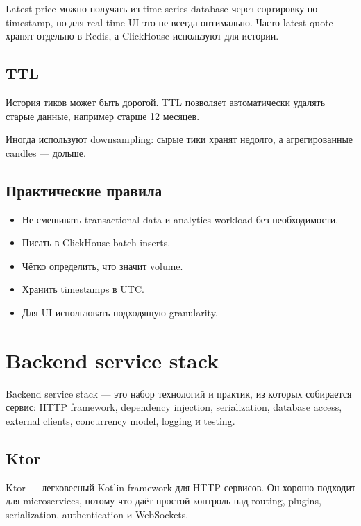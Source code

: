 \documentclass[12pt,a4paper]{article}
\begin{document}
Latest price можно получать из time-series database через сортировку по timestamp,
но для real-time UI это не всегда оптимально. Часто latest quote хранят отдельно
в Redis, а ClickHouse используют для истории.

\subsection{TTL}

История тиков может быть дорогой. TTL позволяет автоматически удалять старые
данные, например старше 12 месяцев.

Иногда используют downsampling: сырые тики хранят недолго, а агрегированные
candles --- дольше.

\subsection{Практические правила}

\begin{itemize}
    \item Не смешивать transactional data и analytics workload без необходимости.
    \item Писать в ClickHouse batch inserts.
    \item Чётко определить, что значит volume.
    \item Хранить timestamps в UTC.
    \item Для UI использовать подходящую granularity.
\end{itemize}

\newpage
\section{Backend service stack}

Backend service stack --- это набор технологий и практик, из которых собирается
сервис: HTTP framework, dependency injection, serialization, database access,
external clients, concurrency model, logging и testing.

\subsection{Ktor}

Ktor --- легковесный Kotlin framework для HTTP-сервисов. Он хорошо подходит для
microservices, потому что даёт простой контроль над routing, plugins, serialization,
authentication и WebSockets.
\end{document}
